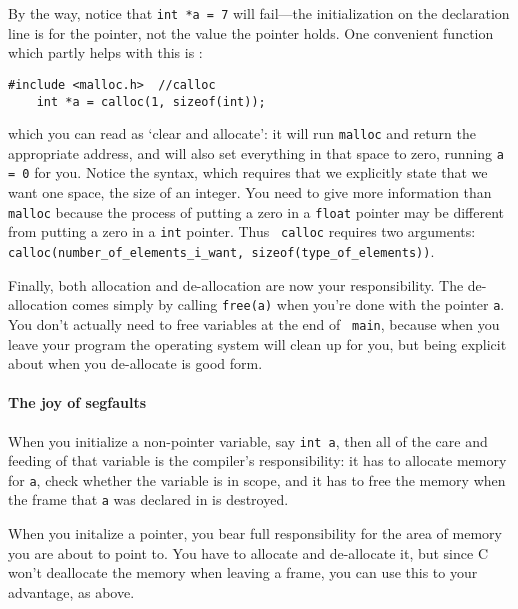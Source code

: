 \documentclass[12pt]{article}
\makeatletter
\def\ttind#1{\index{#1@{\tt #1}}{\tt #1}}
\def\ttindex#1{\index{#1@{\tt #1}}}
\makeatother
\begin{document}
By the way, notice that {\tt int *a = 7} will fail---the initialization on the declaration line is for
the pointer, not the value the pointer holds. One convenient function which partly helps with this is
\ttind{calloc}:
\begin{verbatim}
#include <malloc.h>  //calloc
    int *a = calloc(1, sizeof(int));
\end{verbatim}
which you can read as `clear and allocate': it will run {\tt malloc}
and return the appropriate address, and will also set everything in
that space to zero, running {\tt *a = 0} for you. Notice the syntax,
which requires that we explicitly state that we want one space, the
size of an integer. You need to give more information than {\tt malloc}
because the process of putting a zero in a {\tt float} pointer may be
different from putting a zero in a {\tt int} pointer. Thus {\tt
calloc} requires two arguments: {\tt
calloc(number\_of\_elements\_i\_want, sizeof(type\_of\_elements))}.

Finally, both allocation and de-allocation are now your
responsibility. The de-allocation comes simply by calling {\tt free(a)} \ttindex{free}
when you're done with the pointer {\tt a}. You don't actually need to free variables at the end of {\tt
main}, because when you leave your program the operating system will clean up for you, but being explicit
about when you de-allocate is good form.

\paragraph{The joy of segfaults}  
When you initialize a non-pointer variable, say {\tt int a}, then all of
the care and feeding of that variable is the compiler's responsibility:
it has to allocate memory for {\tt a}, check whether the variable is
in scope, and it has to free the memory when the frame that {\tt a}
was declared in is destroyed.

When you initalize a pointer, you bear full responsibility for the area
of memory you are about to point to. You have to allocate and de-allocate
it, but since C won't deallocate the memory when leaving a frame, you
can use this to your advantage, as above.
\end{document}
